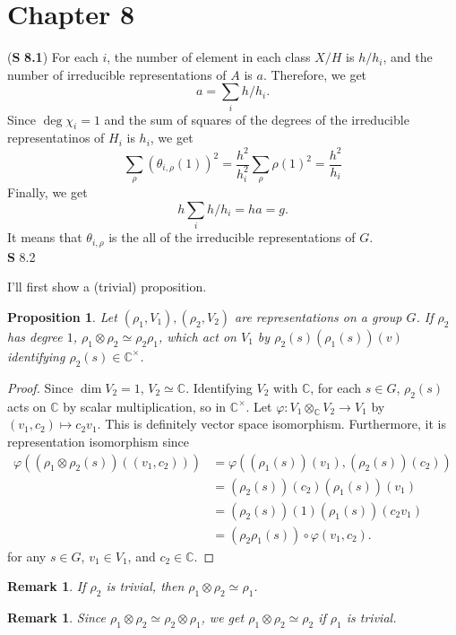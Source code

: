 \documentclass[a4paper, 12pt]{article}
\theoremstyle{Mydefinition}
\newtheorem{remark}[statement]{Remark}
\theoremstyle{Mytheorem}
\newtheorem{proposition}[statement]{Proposition}
\begin{document}
\newpage
\section{Chapter 8}

\noindent (\textbf{S} \textbf{8.1})
For each $i$, the number of element in each class $X/H$ is $h/h_i$, and the number of irreducible representations of $A$ is $a$. Therefore, we get
\begin{equation}
    a = \sum_{i}h/h_i.
\end{equation}
Since $\deg \chi_i=1$ and the sum of squares of the degrees of the irreducible representatinos of $H_i$ is $h_i$, we get
\begin{equation}
    \sum_{\rho}\left(\theta_{i,\rho}(1)\right)^2 = \frac{h^2}{h_i^2}\sum_{\rho}\rho(1)^2 = \frac{h^2}{h_i}
\end{equation}
Finally, we get
\begin{equation}
    h\sum_i h/h_i = ha = g.
\end{equation}
It means that $\theta_{i,\rho}$ is the all of the irreducible representations of $G$.\\

\noindent \textbf{S} 8.2

I'll first show a (trivial) proposition.
\begin{proposition}
Let $(\rho_1, V_1), (\rho_2, V_2)$ are representations on a group $G$. If $\rho_2$ has degree $1$, $\rho_1\otimes \rho_2\simeq \rho_2\rho_1$, which act on $V_1$ by $\rho_2(s)\left(\rho_1(s)\right)(v)$ identifying $\rho_2(s)\in\mathbb{C}^\times$.
\end{proposition}
\begin{proof}
Since $\dim V_2 = 1$, $V_2\simeq \mathbb{C}$. Identifying $V_2$ with $\mathbb{C}$, for each $s\in G$, $\rho_2(s)$ acts on $\mathbb{C}$ by scalar multiplication, so in $\mathbb{C}^\times$. Let $\varphi:V_1\otimes_{\mathbb{C}}V_2\rightarrow V_1$ by $(v_1,c_2)\mapsto c_2v_1$. This is definitely vector space isomorphism. Furthermore, it is representation isomorphism since
\begin{equation}
\begin{split}
    \varphi\left(\left(\rho_1\otimes \rho_2(s)\right)((v_1, c_2))\right) &= \varphi\left(\left(\rho_1(s)\right)(v_1), \left(\rho_2(s)\right)(c_2)\right) \\
    &= \left(\rho_2(s)\right)(c_2)\left(\rho_1(s)\right)(v_1)\\
    &=\left(\rho_2(s)\right)(1)\left(\rho_1(s)\right)(c_2v_1)\\
    &=\left(\rho_2\rho_1(s)\right)\circ \varphi(v_1, c_2).
\end{split}
\end{equation}
for any $s\in G$, $v_1\in V_1$, and $c_2\in \mathbb{C}$.
\end{proof}
\begin{remark}
If $\rho_2$ is trivial, then $\rho_1\otimes \rho_2\simeq \rho_1$.
\end{remark}
\begin{remark}
Since $\rho_1\otimes \rho_2 \simeq \rho_2\otimes \rho_1$, we get $\rho_1\otimes \rho_2\simeq \rho_2$ if $\rho_1$ is trivial.
\end{remark}
\end{document}
